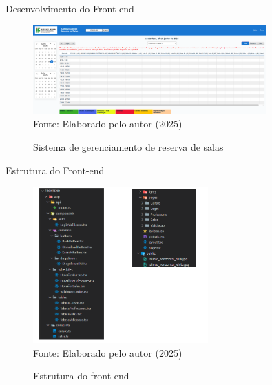 \begin{frame}{Desenvolvimento do Front-end}
    \begin{figure}
        \centering
        \vspace{-0.5cm}
        \caption{Sistema de gerenciamento de reserva de salas}
        \vspace{-0.2cm}
        \includegraphics[width=0.8\textwidth]{figuras/front-13.png}
        \\ %
        \small Fonte: Elaborado pelo autor (2025)
    \end{figure}
\end{frame}

\begin{frame}{Estrutura do Front-end}
    \begin{figure}
        \centering
        \vspace{-0.5cm}
        \caption{Estrutura do front-end}
        \vspace{-0.2cm}
        \includegraphics[width=0.6\textwidth]{figuras/front-14.png}
        \\ %
        \small Fonte: Elaborado pelo autor (2025)
    \end{figure}
\end{frame}

